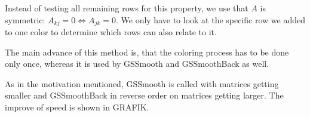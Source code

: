 \documentclass[a4paper,11pt]{scrartcl}
\begin{document}
Instead of testing all remaining rows for this property, we use that $A$ is
 symmetric: $A_{kj} = 0 \Leftrightarrow A_{jk} = 0$. We only have to look 
at the specific row we added to one color to determine which rows can also
 relate to it.

The main advance of this method is, that the coloring process has to be
 done only once, whereas it is used by GSSmooth and GSSmoothBack as well.

As in the motivation mentioned, GSSmooth is called with matrices getting
 smaller and GSSmoothBack in reverse order on matrices getting larger.
 The improve of speed is shown in GRAFIK.
\end{document}
